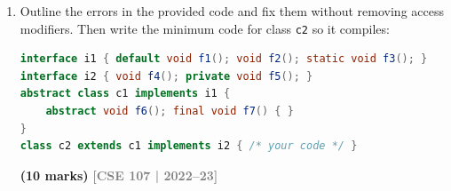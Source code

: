 \documentclass[12pt,a3paper]{article}
\newcommand{\yr}[1]{\hfill\textcolor{gray}{\small\textbf{[#1]}}}
\newcommand{\mk}[1]{\textcolor{orange!70!black}{\small\textbf{(#1 marks)}}}
\begin{document}
\begin{enumerate}
\begin{tcolorbox}
\medskip
\textbf{Problems in the given code:}

\begin{enumerate}[label=\textbf{\arabic*.}]
  \item \texttt{showNested()} prints \texttt{b} and \texttt{c} ---
    these belong to \texttt{Y} and \texttt{Z} respectively and are
    not directly accessible in \texttt{X}.
  \item \texttt{static class Z} tries to access \texttt{a} (non-static
    member of \texttt{X}) --- illegal.
  \item In \texttt{main}: \texttt{Y obY = new Y()} --- wrong; must be
    \texttt{X.Y} via outer object.
  \item In \texttt{main}: \texttt{Z obZ = new Z()} --- wrong; must be
    \texttt{X.Z}.
\end{enumerate}

\medskip
\textbf{Fixed \texttt{main} method:}

\begin{lstlisting}[language=Java]
class Test {
    public static void main(String[] args) {
        X obX = new X();
        obX.display();
        obX.showNested();

        X.Y obY = obX.new Y();  // inner class: needs outer object
        obY.display();

        X.Z obZ = new X.Z();    // static nested: no outer object needed
        obZ.display();
    }
}
\end{lstlisting}

\end{tcolorbox}



\item Outline the errors in the provided code and fix them without removing access modifiers. Then write the minimum code for class \texttt{c2} so it compiles:
\begin{lstlisting}[language=Java]
interface i1 { default void f1(); void f2(); static void f3(); }
interface i2 { void f4(); private void f5(); }
abstract class c1 implements i1 {
    abstract void f6(); final void f7() { }
}
class c2 extends c1 implements i2 { /* your code */ }
\end{lstlisting}
\mk{10}
\yr{CSE 107 | 2022--23}

\begin{tcolorbox}[enhanced,breakable,ansbox,
  colback=cD!4,colframe=cD,boxrule=0.8pt,arc=5pt,
  title={\textbf{Answer --- Fix Errors in Interfaces \& Write \texttt{c2}}},
  fonttitle=\bfseries\color{white},colbacktitle=cD]


\end{tcolorbox}
\end{enumerate}
\end{document}
